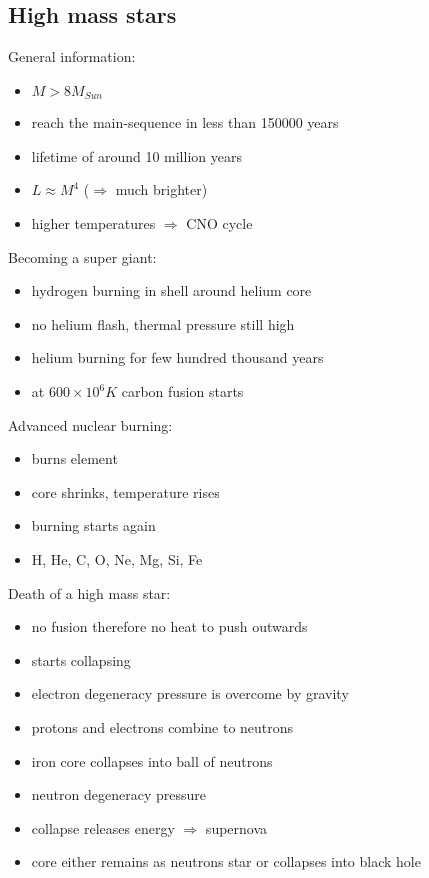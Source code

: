 \documentclass{article}
\theoremstyle{sltheorem}
\begin{document}
\subsection{High mass stars}
General information:
\begin{itemize}
    \item $M > 8M_{Sun}$
    \item reach the main-sequence in less than 150000 years
    \item lifetime of around 10 million years
    \item $L\approx M^4$ ($\Rightarrow$ much brighter)
    \item higher temperatures $\Rightarrow$ CNO cycle
\end{itemize}
Becoming a super giant:
\begin{itemize}
    \item hydrogen burning in shell around helium core
    \item no helium flash, thermal pressure still high
    \item helium burning for few hundred thousand years
    \item at $600 \times 10^6K$ carbon fusion starts
\end{itemize}
Advanced nuclear burning:
\begin{itemize}
    \item burns element
    \item core shrinks, temperature rises
    \item burning starts again
    \item H, He, C, O, Ne, Mg, Si, Fe
\end{itemize}
Death of a high mass star:
\begin{itemize}
    \item no fusion therefore no heat to push outwards
    \item starts collapsing
    \item electron degeneracy pressure is overcome by gravity
    \item protons and electrons combine to neutrons
    \item iron core collapses into ball of neutrons
    \item neutron degeneracy pressure
    \item collapse releases energy $\Rightarrow$ supernova
    \item core either remains as neutrons star or collapses into black hole
\end{itemize}
\end{document}
